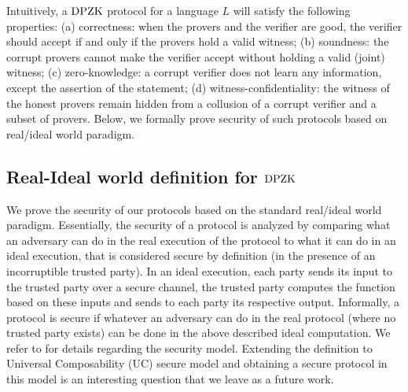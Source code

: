 Intuitively, a $\text{DPZK}$ protocol for a language $L$ will satisfy the following properties: (a)  correctness:  when the provers and the verifier are good, the verifier should accept if and only if the provers hold a valid witness; (b) soundness:  the corrupt provers cannot make the verifier accept without holding a valid (joint) witness; (c) zero-knowledge: a corrupt verifier does not learn any information, except  the assertion of the statement; (d)  witness-confidentiality: the witness of the honest provers remain hidden from a collusion of a corrupt verifier and a subset of provers. Below, we formally prove security of such protocols based on real/ideal world paradigm. 

\subsection{Real-Ideal world definition for $\text{DPZK}$}\label{subsec:real_ideal_def}
We prove the security of our protocols based on the standard real/ideal world paradigm.  Essentially, the security of a protocol is analyzed by comparing what an adversary can do in the real execution of the protocol to what it can do in an ideal execution,  that is considered secure by definition (in the presence of an incorruptible trusted party). In an ideal execution, each party sends its input to the trusted party over a secure channel, the trusted party computes the function based on these inputs and sends to each party its respective output.  Informally, a protocol is secure if whatever an adversary can do in the real protocol (where no trusted party exists) can be done in the above described ideal computation. We refer to \cite{Canetti00,Goldreich2001,Lindell17,CohenL14} for details regarding the security model. 
Extending the definition to Universal Composability (UC)\cite{UC} secure model and obtaining a secure protocol in this model is an interesting question that we leave as a future work.

